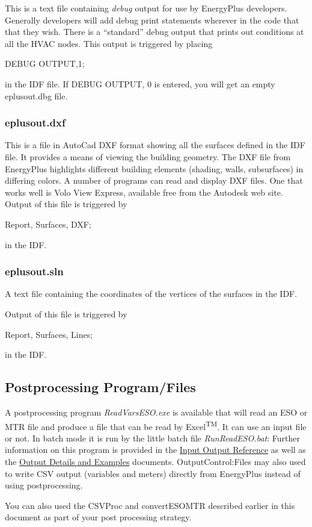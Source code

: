 This is a text file containing \emph{debug} output for use by EnergyPlus developers. Generally developers will add debug print statements wherever in the code that that they wish. There is a ``standard'' debug output that prints out conditions at all the HVAC nodes. This output is triggered by placing

DEBUG OUTPUT,1;

in the IDF file. If DEBUG OUTPUT, 0 is entered, you will get an empty eplusout.dbg file.

\subsubsection{eplusout.dxf}\label{eplusout.dxf}

This is a file in AutoCad DXF format showing all the surfaces defined in the IDF file. It provides a means of viewing the building geometry. The DXF file from EnergyPlus highlights different building elements (shading, walls, subsurfaces) in differing colors. A number of programs can read and display DXF files. One that works well is Volo View Express, available free from the Autodesk web site. Output of this file is triggered by

Report, Surfaces, DXF;

in the IDF.

\subsubsection{eplusout.sln}\label{eplusout.sln}

A text file containing the coordinates of the vertices of the surfaces in the IDF.

Output of this file is triggered by

Report, Surfaces, Lines;

in the IDF.

\subsection{Postprocessing Program/Files}\label{postprocessing-programfiles-000}

A postprocessing program \emph{ReadVarsESO.exe} is available that will read an ESO or MTR file and produce a file that can be read by Excel\textsuperscript{TM}. It can use an input file or not. In batch mode it is run by the little batch file \emph{RunReadESO.bat}: Further information on this program is provided in the \href{InputOutputReference.pdf}{Input Output Reference} as well as the \href{OutputDetailsAndExamples.pdf}{Output Details and Examples} documents. OutputControl:Files may also used to write CSV output (variables and meters) directly from EnergyPlus instead of using postprocessing.

You can also used the CSVProc and convertESOMTR described earlier in this document as part of your post processing strategy.

